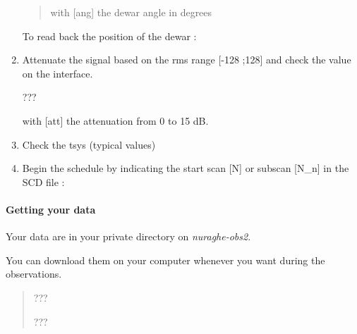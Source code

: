 \documentclass[letterpaper,10pt,english]{sphinxmanual}
\begin{document}
\begin{enumerate}
\begin{quote}
\begin{itemize}
\end{itemize}

     with {[}ang{]} the dewar angle in degrees
\end{quote}

To read back the position of the dewar :
\begin{quote}

\end{quote}

\item {} 
Attenuate the signal based on the rms range {[}-128 ;128{]} and check the value on the interface.

  ???

    with {[}att{]} the attenuation from 0 to 15 dB.

\item {} 
Check the tsys (typical values)
\begin{quote}

\end{quote}

\item {} 
Begin the schedule by indicating the start scan {[}N{]} or subscan {[}N\_n{]} in the SCD file :
\begin{quote}

\end{quote}

\end{enumerate}


\paragraph{Getting your data}
\label{SpectralLine/K-band/SARDARA/get-data:getting-your-data}\label{SpectralLine/K-band/SARDARA/get-data::doc}
Your data are in your private directory on \emph{nuraghe-obs2}.

You can download them on your computer whenever you want during the observations.
\begin{quote}

  ???

 ???
\end{quote}
\end{document}
